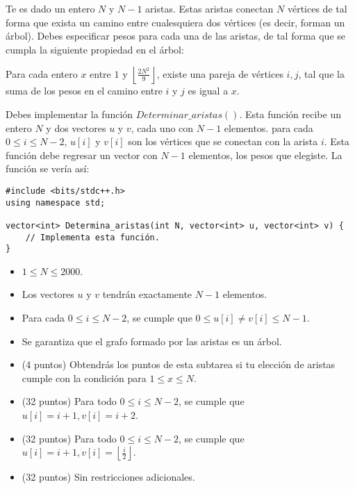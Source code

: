 \documentclass[12pt]{scrartcl}
\begin{document}
    
    
    \vspace{10pt}

    
    
        Te es dado un entero $N$ y $N - 1$ aristas. Estas aristas conectan $N$ vértices de tal forma que exista un camino entre cualesquiera dos vértices (es decir, forman un árbol). Debes especificar pesos para cada una de las aristas, de tal forma que se cumpla la siguiente propiedad en el árbol:
        
        Para cada entero $x$ entre $1$ y $\left\lfloor \frac{2N^2}{9} \right\rfloor$, existe una pareja de vértices $i, j$, tal que la suma de los pesos en el camino entre $i$ y $j$ es igual a $x$.
    

        Debes implementar la función $Determinar\_aristas()$. Esta función recibe un entero $N$ y dos vectores $u$ y $v$, cada uno con $N - 1$ elementos. para cada $0 \le i \le N - 2$, $u[i]$ y $v[i]$ son los vértices que se conectan con la arista $i$. Esta función debe regresar un vector con $N - 1$ elementos, los pesos que elegiste.
        La función se vería así:

\begin{verbatim}
#include <bits/stdc++.h>
using namespace std;

vector<int> Determina_aristas(int N, vector<int> u, vector<int> v) {
    // Implementa esta función.
}
\end{verbatim}

        \begin{itemize}
            \item $1 \le N \le 2000$.
            \item Los vectores $u$ y $v$ tendrán exactamente $N - 1$ elementos.
            \item Para cada $0 \le i \le N - 2$, se cumple que $0 \le u[i] \neq v[i] \le N - 1$. 
            \item Se garantiza que el grafo formado por las aristas es un árbol.
        \end{itemize}
    


    \begin{itemize}
        \item (4 puntos) Obtendrás los puntos de esta subtarea si tu elección de aristas cumple con la condición para $1 \le x \le N$.
        \item (32 puntos) Para todo $0 \le i \le N - 2$, se cumple que $u[i] = i + 1, v[i] = i + 2$.
        \item (32 puntos) Para todo $0 \le i \le N - 2$, se cumple que $u[i] = i + 1, v[i] = \left\lfloor\frac{i}{2} \right\rfloor$.
        \item (32 puntos) Sin restricciones adicionales.
    \end{itemize}
\end{document}

